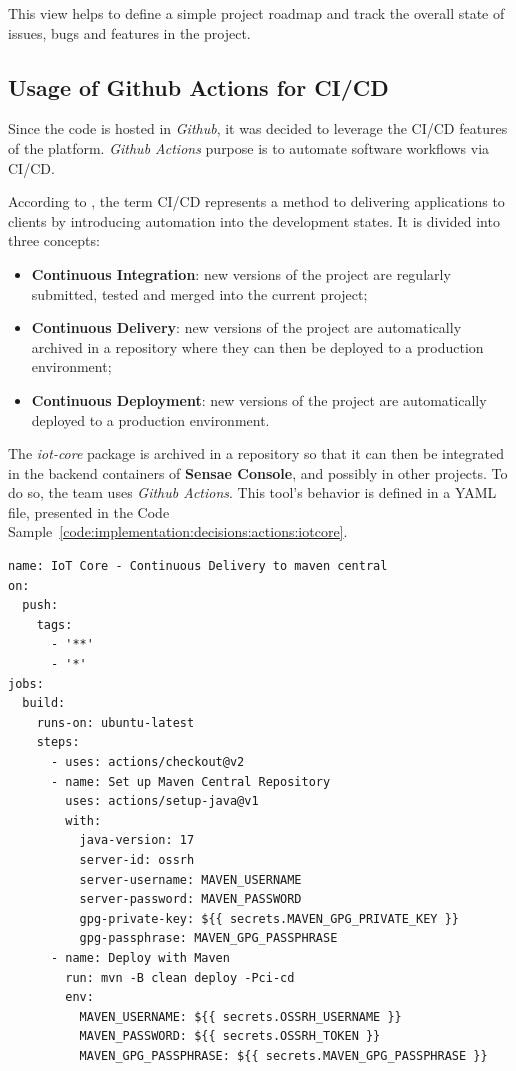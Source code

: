 This view helps to define a simple project roadmap and track the overall state of issues, bugs and features in the project.

\subsection{Usage of Github Actions for CI/CD}
\label{subsec:implementation:decisions:actions}

Since the code is hosted in \textit{Github}, it was decided to leverage the CI/CD features of the platform. \textit{Github Actions} purpose is to automate software workflows via CI/CD.

According to \cite{cicd}, the term CI/CD represents a method to delivering applications to clients by introducing automation into the development states.
It is divided into three concepts:

\begin{itemize}
    \item \textbf{Continuous Integration}: new versions of the project are regularly submitted, tested and merged into the current project;
    \item \textbf{Continuous Delivery}: new versions of the project are automatically archived in a repository where they can then be deployed to a production environment;
    \item \textbf{Continuous Deployment}: new versions of the project are automatically deployed to a production environment.
\end{itemize}

The \textit{iot-core} package is archived in a repository so that it can then be integrated in the backend containers of \textbf{Sensae Console}, and possibly in other projects. To do so, the team uses \textit{Github Actions}. This tool's behavior is defined in a YAML file, presented in the Code Sample~\ref{code:implementation:decisions:actions:iotcore}.

\begin{lstlisting}[style=yaml, caption=Configuration File for \textit{iot-core} Continuous Delivery, label={code:implementation:decisions:actions:iotcore}]
name: IoT Core - Continuous Delivery to maven central
on:
  push:
    tags:
      - '**'
      - '*'
jobs:
  build:
    runs-on: ubuntu-latest
    steps:
      - uses: actions/checkout@v2
      - name: Set up Maven Central Repository
        uses: actions/setup-java@v1
        with:
          java-version: 17
          server-id: ossrh
          server-username: MAVEN_USERNAME
          server-password: MAVEN_PASSWORD
          gpg-private-key: ${{ secrets.MAVEN_GPG_PRIVATE_KEY }}
          gpg-passphrase: MAVEN_GPG_PASSPHRASE
      - name: Deploy with Maven
        run: mvn -B clean deploy -Pci-cd
        env:
          MAVEN_USERNAME: ${{ secrets.OSSRH_USERNAME }}
          MAVEN_PASSWORD: ${{ secrets.OSSRH_TOKEN }}
          MAVEN_GPG_PASSPHRASE: ${{ secrets.MAVEN_GPG_PASSPHRASE }}
\end{lstlisting}

